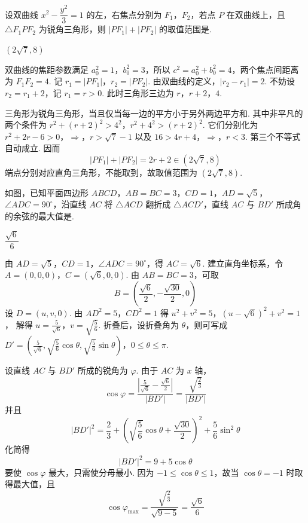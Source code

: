 \begin{problem}
设双曲线 \(x^2-\dfrac{y^2}{3}=1\) 的左，右焦点分别为 \(F_1\)，\(F_2\)，若点 \(P\) 在双曲线上，且 \(\triangle F_1PF_2\) 为锐角三角形，则 \(|PF_1|+|PF_2|\) 的取值范围是\fillinblank{}.
\end{problem}

\begin{answer}
\(\left(2\sqrt7,8\right)\)
\end{answer}

\begin{solution}
双曲线的焦距参数满足 \(a_0^2=1\)，\(b_0^2=3\)，所以 \(c^2=a_0^2+b_0^2=4\)，两个焦点间距离为 \(F_1F_2=4\). 记
\(r_1=|PF_1|\)，\(r_2=|PF_2|\).
由双曲线的定义，\(|r_2-r_1|=2\). 不妨设 \(r_2=r_1+2\)，记 \(r_1=r>0\). 此时三角形三边为 \(r\)，\(r+2\)，\(4\).

三角形为锐角三角形，当且仅当每一边的平方小于另外两边平方和. 其中非平凡的两个条件为
\(r^2+(r+2)^2>4^2\)，\(r^2+4^2>(r+2)^2\).
它们分别化为
\(r^2+2r-6>0\)，\(\Longrightarrow\)，\(r>\sqrt7-1\)
以及
\(16>4r+4\)，\(\Longrightarrow\)，\(r<3\).
第三个不等式自动成立. 因而
\[
|PF_1|+|PF_2|=2r+2\in\left(2\sqrt7,8\right)
\]
端点分别对应直角三角形，不能取到，故取值范围为 \(\left(2\sqrt7,8\right)\).
\end{solution}

\begin{problem}
如图，已知平面四边形 \(ABCD\)，\(AB=BC=3\)，\(CD=1\)，\(AD=\sqrt5\)，\(\angle ADC=90^\circ\)，沿直线 \(AC\) 将 \(\triangle ACD\) 翻折成 \(\triangle ACD'\)，直线 \(AC\) 与 \(BD'\) 所成角的余弦的最大值是\fillinblank{}.

\end{problem}

\begin{answer}
\(\dfrac{\sqrt6}{6}\)
\end{answer}

\begin{solution}
由 \(AD=\sqrt5\)，\(CD=1\)，\(\angle ADC=90^\circ\)，得 \(AC=\sqrt6\). 建立直角坐标系，令
\(A=(0,0,0)\)，\(C=(\sqrt6,0,0)\).
由 \(AB=BC=3\)，可取
\[
B=\left(\frac{\sqrt6}{2},-\frac{\sqrt{30}}2,0\right)
\]
设 \(D=(u,v,0)\). 由 \(AD^2=5\)，\(CD^2=1\) 得
\(u^2+v^2=5\)，\((u-\sqrt6)^2+v^2=1\)，
解得 \(u=\frac{5}{\sqrt6}\)，\(v=\sqrt{\frac{5}{6}}\). 折叠后，设折叠角为 \(\theta\)，则可写成
\(D'=\left(\frac5{\sqrt6},\sqrt{\frac56}\cos\theta,\sqrt{\frac56}\sin\theta\right)\)，\(0\leqslant\theta\leqslant\pi\).

设直线 \(AC\) 与 \(BD'\) 所成的锐角为 \(\varphi\). 由于 \(AC\) 为 \(x\) 轴，
\[
\cos\varphi=\frac{\left|\frac5{\sqrt6}-\frac{\sqrt6}{2}\right|}{|BD'|}=\frac{\sqrt{\frac{2}{3}}}{|BD'|}
\]
并且
\[
|BD'|^2
=\frac23+\left(\sqrt{\frac56}\cos\theta+\frac{\sqrt{30}}2\right)^2+\frac56\sin^2\theta
\]
化简得
\[
|BD'|^2=9+5\cos\theta
\]
要使 \(\cos\varphi\) 最大，只需使分母最小. 因为 \(-1\leqslant\cos\theta\leqslant1\)，故当 \(\cos\theta=-1\) 时取得最大值，且
\[
\cos\varphi_{\max}=\frac{\sqrt{\frac{2}{3}}}{\sqrt{9-5}}=\frac{\sqrt6}{6}
\]
\end{solution}

